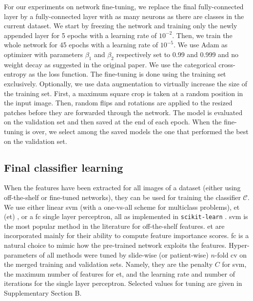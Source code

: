 For our experiments on network fine-tuning, we replace the final fully-connected layer by a fully-connected layer with as many neurons as there are classes in the current dataset. We start by freezing the network and training only the newly appended layer for 5 epochs with a learning rate of $10^{-2}$. Then, we train the whole network for 45 epochs with a learning rate of $10^{-5}$. We use Adam \parencite{kingma2014adam} as optimizer with parameters $\beta_1$ and $\beta_2$ respectively set to 0.99 and 0.999 and no weight decay as suggested in the original paper. We use the categorical cross-entropy as the loss function. The fine-tuning is done using the training set exclusively. Optionally, we use data augmentation to virtually increase the size of the training set. First, a maximum square crop is taken at a random position in the input image. %
Then, random flips and rotations are applied to the resized patches before they are forwarded through the network. The model is evaluated on the validation set and then saved at the end of each epoch. When the fine-tuning is over, we select among the saved models the one that performed the best on the validation set.


\subsection{Final classifier learning}
When the features have been extracted for all images of a dataset (either using off-the-shelf or fine-tuned networks), they can be used for training the classifier $\mathcal{C}$. 
We use either linear \acrshort{svm} \parencite{fan2008liblinear} (with a one-vs-all scheme for multiclass problems), \acrlong{et} (\acrshort{et}) \parencite{geurts2006extremely}, or a \acrshort{fc} single layer perceptron, all as implemented in \texttt{scikit-learn} \parencite{scikit-learn}. \acrshort{svm} is the most popular method in the literature for off-the-shelf features. \acrshort{et} are incorporated mainly for their ability to compute feature importance scores. \acrshort{fc} is a natural choice to mimic how the pre-trained network exploits the features. Hyper-parameters of all methods were tuned by slide-wise (or patient-wise) $n$-fold \acrlong{cv} on the merged training and validation sets. Namely, they are the penalty $C$ for \acrshort{svm}, the maximum number of features for \acrshort{et}, and the learning rate and number of iterations for the single layer perceptron. Selected values for tuning are given in Supplementary Section B.


